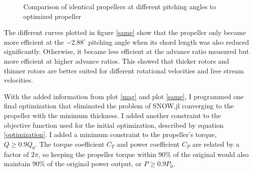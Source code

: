 \documentclass[journal ]{new-aiaa}
\begin{document}
\begin{figure}[H]
\centering
	
	\caption{Comparison of identical propellers at different pitching angles to optimized propeller}
	\captionsetup{aboveskip=0pt,font=it}
	\label{same}
\end{figure}

The different curves plotted in figure \eqref{same} show that the propeller only became more efficient at the $-2.88^{\circ}$ pitching angle when its chord length was also reduced significantly. Otherwise, it became less efficient at the advance ratio measured but more efficient at higher advance ratios. This showed that thicker rotors and thinner rotors are better suited for different rotational velocities and free stream velocities.

With the added information from plot \eqref{mag} and plot \eqref{same}, I programmed one final optimization that eliminated the problem of SNOW.jl converging to the propeller with the minimum thickness. I added another constraint to the objective function used for the initial optimization, described by equation \eqref{optimization}. I added a minimum constraint to the propeller's torque, $Q \geq 0.9 Q_{0}$. The torque coefficient $C_{T}$ and power coefficient $C_{P}$ are related by a factor of $2 \pi$, so keeping the propeller torque within 90\% of the original would also maintain 90\% of the original power output, or $P \geq 0.9 P_{0}$.
\end{document}
